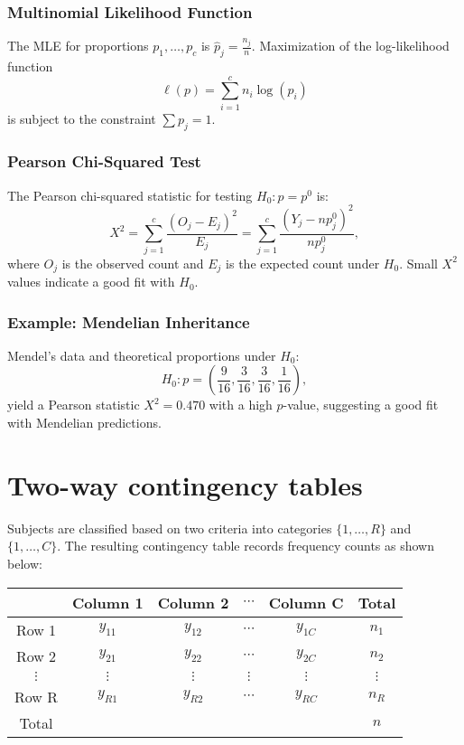 \documentclass{article}
\begin{document}
\subsubsection{Multinomial Likelihood Function}
The MLE for proportions $p_1, \ldots, p_c$ is $\hat{p}_j = \frac{n_j}{n}$. Maximization of the log-likelihood function
$$
\ell(p) = \sum_{i=1}^{c} n_i \log(p_i)
$$
is subject to the constraint $\sum p_j = 1$.

\subsubsection{Pearson Chi-Squared Test}
The Pearson chi-squared statistic for testing $H_0: p = p^0$ is:
$$
X^2 = \sum_{j=1}^{c} \frac{(O_j - E_j)^2}{E_j} = \sum_{j=1}^{c} \frac{(Y_j - n p_j^0)^2}{n p_j^0},
$$
where $O_j$ is the observed count and $E_j$ is the expected count under $H_0$. Small $X^2$ values indicate a good fit with $H_0$.

\subsubsection{Example: Mendelian Inheritance}
Mendel's data and theoretical proportions under $H_0$:
$$
H_0: p = \left(\frac{9}{16}, \frac{3}{16}, \frac{3}{16}, \frac{1}{16}\right),
$$
yield a Pearson statistic $X^2 = 0.470$ with a high $p$-value, suggesting a good fit with Mendelian predictions.

\section{Two-way contingency tables}

Subjects are classified based on two criteria into categories $\{1, \ldots, R\}$ and $\{1, \ldots, C\}$. The resulting contingency table records frequency counts as shown below:
\begin{center}
\begin{tabular}{c|cccc|c}
 & Column 1 & Column 2 & $\cdots$ & Column C & Total \\
\hline
Row 1 & $y_{11}$ & $y_{12}$ & $\cdots$ & $y_{1 C}$ & $n_{1}$ \\
Row 2 & $y_{21}$ & $y_{22}$ & $\cdots$ & $y_{2 C}$ & $n_{2}$ \\
$\vdots$ & $\vdots$ & $\vdots$ & $\vdots$ & $\vdots$ & $\vdots$ \\
Row R & $y_{R 1}$ & $y_{R 2}$ & $\cdots$ & $y_{R C}$ & $n_{R}$ \\
\hline
Total &  &  &  &  & $n$ \\
\hline
\end{tabular}
\end{center}
\end{document}
